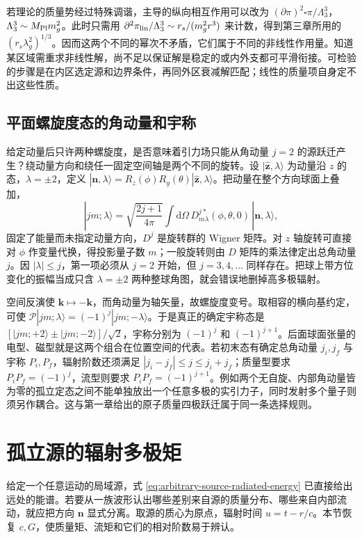 若理论的质量势经过特殊调谐，主导的纵向相互作用可以改为 $(\partial\pi)^2\square\pi/\Lambda_3^3$，$\Lambda_3^3\sim M_{\rm Pl} m_g^2$。此时只需用 $\partial^2\pi_{\rm lin}/\Lambda_3^3\sim r_s/(m_g^2r^3)$ 来计数，得到第三章所用的 $(r_s\lambda_g^2)^{1/3}$。因而这两个不同的幂次不矛盾，它们属于不同的非线性作用量。知道某区域需重求非线性解，尚不足以保证解是稳定的或内外支都可平滑衔接。可检验的步骤是在内区选定源和边界条件，再同外区衰减解匹配；线性的质量项自身定不出这些性质。

\subsection{平面螺旋度态的角动量和宇称}

给定动量后只许两种螺旋度，是否意味着引力场只能从角动量 $j=2$ 的源跃迁产生？绕动量方向和绕任一固定空间轴是两个不同的旋转。设 $|\hat{\bm z},\lambda\rangle$ 为动量沿 $z$ 的态，$\lambda=\pm2$，定义 $|\bm n,\lambda\rangle=R_z(\phi)R_y(\theta)|\hat{\bm z},\lambda\rangle$。把动量在整个方向球面上叠加，
\[
 |jm;\lambda\rangle
 =\sqrt{\frac{2j+1}{4\pi}}\int\mathrm d\Omega\,
 D^{j*}_{m\lambda}(\phi,\theta,0)\,|\bm n,\lambda\rangle ,
\]
固定了能量而未指定动量方向，$D^j$ 是旋转群的 Wigner 矩阵。对 $z$ 轴旋转可直接对 $\phi$ 作变量代换，得投影量子数 $m$；一般旋转则由 $D$ 矩阵的乘法律定出总角动量 $j$。因 $|\lambda|\le j$，第一项必须从 $j=2$ 开始，但 $j=3,4,\ldots$ 同样存在。把球上带方位变化的振幅当成只含 $\lambda=\pm2$ 两种整球角图，就会错误地删掉高多极辐射。

空间反演使 $\bm k\mapsto-\bm k$，而角动量为轴矢量，故螺旋度变号。取相容的横向基约定，可使 $\mathcal P|jm;\lambda\rangle=(-1)^j|jm;-\lambda\rangle$。于是真正的确定宇称态是 $[|jm;+2\rangle\pm|jm;-2\rangle]/\sqrt2$，宇称分别为 $(-1)^j$ 和 $(-1)^{j+1}$。后面球面张量的电型、磁型就是这两个组合在位置空间的代表。若初末态有确定总角动量 $j_i,j_f$ 与宇称 $P_i,P_f$，辐射阶数还须满足 $|j_i-j_f|\le j\le j_i+j_f$；质量型要求 $P_iP_f=(-1)^j$，流型则要求 $P_iP_f=(-1)^{j+1}$。例如两个无自旋、内部角动量皆为零的孤立定态之间不能单独放出一个任意多极的实引力子，同时发射多个量子则须另作耦合。这与第一章给出的原子质量四极跃迁属于同一条选择规则。

\section{孤立源的辐射多极矩}\label{sec:gw-a-multipoles}

给定一个任意运动的局域源，式 \eqref{eq:arbitrary-source-radiated-energy} 已直接给出远处的能谱。若要从一族波形认出哪些差别来自源的质量分布、哪些来自内部流动，就应把方向 $\bm n$ 显式分离。取源的质心为原点，辐射时间 $u=t-r/c$。本节恢复 $c,G$，使质量矩、流矩和它们的相对阶数易于辨认。

